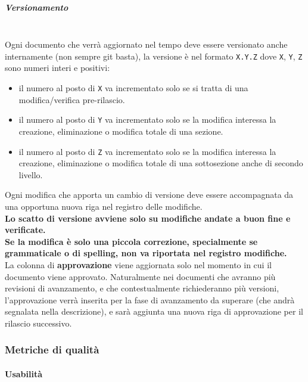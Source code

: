 \subparagraph{Versionamento}
\mbox{}\\
Ogni documento che verrà aggiornato nel tempo deve essere versionato anche
internamente (non sempre git basta), la versione è nel formato \texttt{X.Y.Z} dove
\texttt{X}, \texttt{Y}, \texttt{Z} sono numeri interi e positivi:
\begin{itemize}
    \item il numero al posto di \texttt{X} va incrementato solo se si tratta di una
    modifica/verifica pre-rilascio.
    \item il numero al posto di \texttt{Y} va incrementato solo se la modifica
    interessa la creazione, eliminazione o modifica totale di una sezione.
    \item il numero al posto di \texttt{Z} va incrementato solo se la modifica
    interessa la creazione, eliminazione o modifica totale di una sottosezione
    anche di secondo livello.
\end{itemize}
Ogni modifica che apporta un cambio di versione deve essere accompagnata da una
opportuna nuova riga nel registro delle modifiche.
\\

\noindent
\textbf{Lo scatto di versione avviene solo su modifiche andate a buon fine e verificate.}
\\

\noindent
\textbf{Se la modifica è solo una piccola correzione, specialmente se grammaticale o di
spelling, non va riportata nel registro modifiche.}\\


\noindent
La colonna di \textbf{approvazione} viene aggiornata solo nel momento in cui il documento viene approvato. 
Naturalmente nei documenti che avranno più revisioni di avanzamento, e che contestualmente richiederanno più versioni, 
l'approvazione verrà inserita per la fase di avanzamento da superare (che andrà segnalata nella descrizione), e sarà 
aggiunta una nuova riga di approvazione per il rilascio successivo.

\subsubsection{Metriche di qualità}
\paragraph{Usabilità}
\mbox{}\\
\setlength\extrarowheight{5pt}

